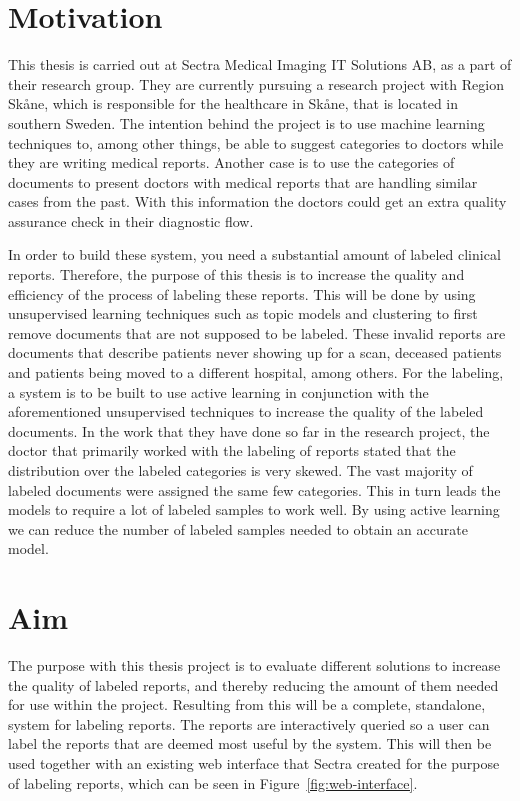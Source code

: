 \section{Motivation}
\label{sec:motivation}

This thesis is carried out at Sectra Medical Imaging IT Solutions AB, as a part of their research group.
They are currently pursuing a research project with Region Skåne, which is responsible for the healthcare in Skåne, that is located in southern Sweden.
The intention behind the project is to use machine learning techniques to, among other things, be able to suggest categories to doctors while they are writing medical reports.
Another case is to use the categories of documents to present doctors with medical reports that are handling similar cases from the past.
With this information the doctors could get an extra quality assurance check in their diagnostic flow.

In order to build these system, you need a substantial amount of labeled clinical reports.
Therefore, the purpose of this thesis is to increase the quality and efficiency of the process of labeling these reports.
This will be done by using unsupervised learning techniques such as topic models and clustering to first remove documents that are not supposed to be labeled.
These invalid reports are documents that describe patients never showing up for a scan, deceased patients and patients being moved to a different hospital, among others.
For the labeling, a system is to be built to use active learning in conjunction with the aforementioned unsupervised techniques to increase the quality of the labeled documents.
In the work that they have done so far in the research project, the doctor that primarily worked with the labeling of reports stated that the distribution over the labeled categories is very skewed.
The vast majority of labeled documents were assigned the same few categories.
This in turn leads the models to require a lot of labeled samples to work well.
By using active learning we can reduce the number of labeled samples needed to obtain an accurate model.

\section{Aim}
\label{sec:aim}

The purpose with this thesis project is to evaluate different solutions to increase the quality of labeled reports, and thereby reducing the amount of them needed for use within the project.
Resulting from this will be a complete, standalone, system for labeling reports.
The reports are interactively queried so a user can label the reports that are deemed most useful by the system.
This will then be used together with an existing web interface that Sectra created for the purpose of labeling reports, which can be seen in Figure~\ref{fig:web-interface}.

